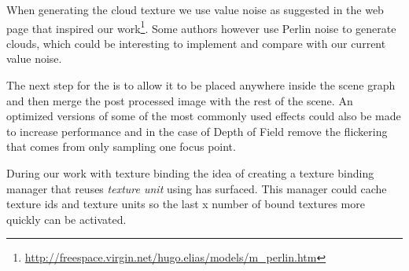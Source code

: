 When generating the cloud texture we use value noise as suggested in
the web page that inspired our
work\footnote{\url{http://freespace.virgin.net/hugo.elias/models/m_perlin.htm}}.
Some authors however use Perlin noise to generate clouds, which could
be interesting to implement and compare with our current value noise.

The next step for the  is to allow it to be
placed anywhere inside the scene graph and then merge the post
processed image with the rest of the scene. An optimized versions of
some of the most commonly used effects could also be made to increase
performance and in the case of Depth of Field remove the flickering
that comes from only sampling one focus point.

During our work with texture binding the idea of 
creating a texture binding manager that reuses \emph{texture unit}
using  has
surfaced. This manager could cache texture ids and texture units so
the last x number of bound textures more quickly can be activated.
